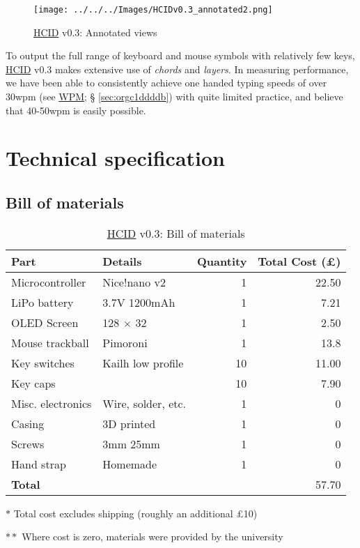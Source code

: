 \documentclass[logo,bsc,singlespacing,parskip]{infthesis}
\begin{document}
\begin{figure}[h]
\centering
\texttt{[image: ../../../Images/HCIDv0.3\_annotated2.png]}
\caption{\hyperref[orgf95a76e]{HCID} v0.3: Annotated views}
\end{figure}

To output the full range of keyboard and mouse symbols with relatively few keys, \hyperref[orgf95a76e]{HCID} v0.3 makes extensive use of \emph{chords} and \emph{layers}. In measuring performance, we have been able to consistently achieve one handed typing speeds of over 30wpm (see \hyperref[sec:orgc1ddddb]{WPM}; § \ref{sec:orgc1ddddb}) with quite limited practice, and believe that 40-50wpm is easily possible.
\section{Technical specification}
\label{sec:org0b54b06}
\subsection{Bill of materials}
\label{sec:org3cb08c7}
\begin{table}
\begin{threeparttable}
\begin{tabular}{llrr}
\toprule
\textbf{Part} & \textbf{Details} & \textbf{Quantity} & \textbf{Total Cost (£)}\\
\midrule
Microcontroller & Nice!nano v2 \autocite{NiceNanoNice} & 1 & 22.50\\
LiPo battery & 3.7V 1200mAh \autocite{adafruitLiPo} & 1 & 7.21\\
OLED Screen & 128 \(\times\) 32 \autocite{128X32OLEDScreen} & 1 & 2.50\\
Mouse trackball & Pimoroni \autocite{TrackballBreakoutPimoroni} & 1 & 13.8\\
Key switches & Kailh low profile \autocite{Mechboards} & 10 & 11.00\\
Key caps & \autocite{Mechboards} & 10 & 7.90\\
Misc. electronics & Wire, solder, etc. & 1 & 0\\
Casing & 3D printed & 1 & 0\\
Screws & 3mm \texttimes{} 25mm & 1 & 0\\
Hand strap & Homemade & 1 & 0\\
\midrule
\textbf{Total} &  &  & 57.70\\
\bottomrule
\end{tabular}
\begin{tablenotes}
\item[] \(\ast\) Total cost excludes shipping (roughly an additional £10)
\item[] \(\ast \ast\) Where cost is zero, materials were provided by the university
\end{tablenotes}
\caption{\label{tab:bom}\hyperref[orgf95a76e]{HCID} v0.3: Bill of materials}
\end{threeparttable}
\end{table}
\end{document}

